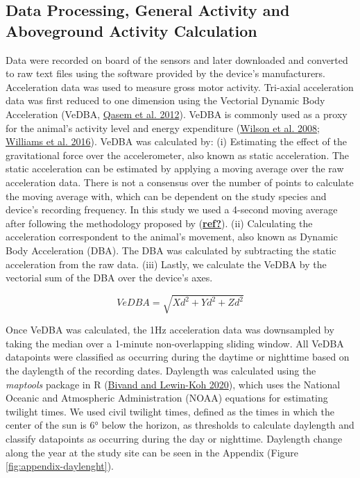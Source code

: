 \documentclass[english,msc,numbers,hidelinks]{coppe}
\begin{document}
  \hypertarget{data-processing-general-activity-and-aboveground-activity-calculation}{%
  \subsection{Data Processing, General Activity and Aboveground Activity Calculation}\label{data-processing-general-activity-and-aboveground-activity-calculation}}

  Data were recorded on board of the sensors and later downloaded and converted to raw text files using the software provided by the device's manufacturers. Acceleration data was used to measure gross motor activity. Tri-axial acceleration data was first reduced to one dimension using the Vectorial Dynamic Body Acceleration (VeDBA, \protect\hyperlink{ref-qasem2012}{Qasem et al. 2012}). VeDBA is commonly used as a proxy for the animal's activity level and energy expenditure (\protect\hyperlink{ref-wilson2008}{Wilson et al. 2008}; \protect\hyperlink{ref-williams2016}{Williams et al. 2016}). VeDBA was calculated by: (i) Estimating the effect of the gravitational force over the accelerometer, also known as static acceleration. The static acceleration can be estimated by applying a moving average over the raw acceleration data. There is not a consensus over the number of points to calculate the moving average with, which can be dependent on the study species and device's recording frequency. In this study we used a 4-second moving average after following the methodology proposed by (\protect\hyperlink{ref-ref}{\textbf{ref?}}). (ii) Calculating the acceleration correspondent to the animal's movement, also known as Dynamic Body Acceleration (DBA). The DBA was calculated by subtracting the static acceleration from the raw data. (iii) Lastly, we calculate the VeDBA by the vectorial sum of the DBA over the device's axes.

  \[ VeDBA = \sqrt{Xd^2 + Yd^2 + Zd^2} \]

  Once VeDBA was calculated, the 1Hz acceleration data was downsampled by taking the median over a 1-minute non-overlapping sliding window. All VeDBA datapoints were classified as occurring during the daytime or nighttime based on the daylength of the recording dates. Daylength was calculated using the \emph{maptools} package in R (\protect\hyperlink{ref-bivand2020}{Bivand and Lewin-Koh 2020}), which uses the National Oceanic and Atmospheric Administration (NOAA) equations for estimating twilight times. We used civil twilight times, defined as the times in which the center of the sun is 6° below the horizon, as thresholds to calculate daylength and classify datapoints as occurring during the day or nighttime. Daylength change along the year at the study site can be seen in the Appendix (Figure \ref{fig:appendix-daylenght}).
\end{document}

